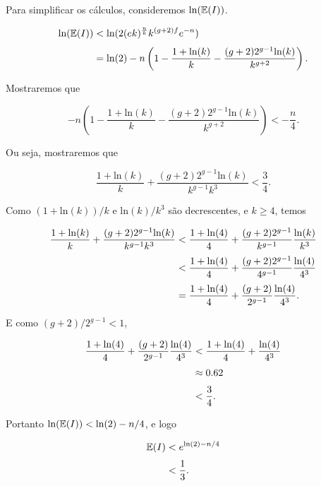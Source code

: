 Para simplificar os cálculos, consideremos $\text{ln}(\mathbb{E}(I))$.

\begin{equation*}
\setlength{\jot}{6pt}
\begin{aligned}
\text{ln}(\bbe(I)) &< \text{ln}(2(ek)^{\frac{n}{k}}k^{(g+2)f}e^{-n})\\
&= \text{ln}(2) -n\left(1 - \frac{1+\text{ln}(k)}{k} - \frac{(g+2)2^{g-1} \text{ln}(k)}{k^{g+2}}\right).
\end{aligned}
\end{equation*}

Mostraremos que 

\[-n\left(1 - \frac{1+\text{ln}(k)}{k} - \frac{(g+2)2^{g-1} \text{ln}(k)}{k^{g+2}}\right) < -\frac{n}{4}.\]

Ou seja, mostraremos que

\[\frac{1+\text{ln}(k)}{k} + \frac{(g+2)2^{g-1} \text{ln}(k)}{k^{g-1}k^3} < \frac{3}{4}.\]

Como $(1+\text{ln}(k))/k$ e $\text{ln}(k)/k^3$ são decrescentes, e $k \geq 4$, temos

\begin{equation*}
\setlength{\jot}{6pt}
\begin{aligned}
\frac{1+\text{ln}(k)}{k} + \frac{(g+2)2^{g-1} \text{ln}(k)}{k^{g-1}k^3} &< \frac{1+\text{ln}(4)}{4} + \frac{(g+2)2^{g-1}}{k^{g-1}}\frac{\text{ln}(k)}{k^3}\\
&< \frac{1+\text{ln}(4)}{4} + \frac{(g+2)2^{g-1}}{4^{g-1}}\frac{\text{ln}(4)}{4^3} \\
&= \frac{1+\text{ln}(4)}{4} + \frac{(g+2)}{2^{g-1}}\frac{\text{ln}(4)}{4^3}.
\end{aligned}
\end{equation*}

E como $(g+2)/2^{g-1} < 1$, 

\begin{equation*}
\setlength{\jot}{6pt}
\begin{aligned}
\frac{1+\text{ln}(4)}{4} + \frac{(g+2)}{2^{g-1}}\frac{\text{ln}(4)}{4^3} &< \frac{1+\text{ln}(4)}{4} + \frac{\text{ln}(4)}{4^3} \\
&\approx 0.62 \\
&< \frac{3}{4}.
\end{aligned}
\end{equation*}

Portanto $\text{ln}(\mathbb{E}(I)) < \text{ln}(2) - n/4$, e logo

\begin{equation*}
\setlength{\jot}{6pt}
\begin{aligned}
\bbe(I) &< e^{\text{ln}(2)-n/4} \\
&< \frac{1}{3}.
\end{aligned}
\end{equation*}

